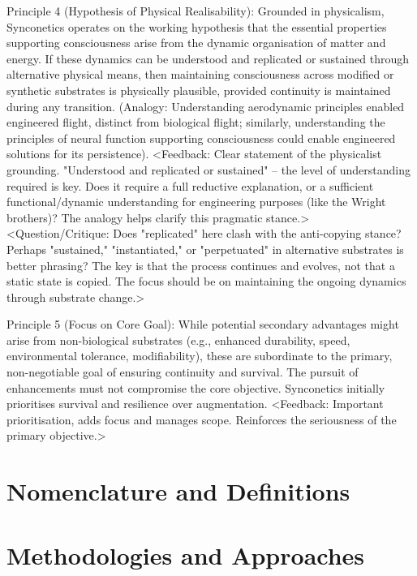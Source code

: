 \documentclass[10pt]{article}
\begin{document}
\begin{sloppypar}
  Principle 4 (Hypothesis of Physical Realisability): Grounded in physicalism, Synconetics operates on the working hypothesis that the essential properties supporting consciousness arise from the dynamic organisation of matter and energy. If these dynamics can be understood and replicated or sustained through alternative physical means, then maintaining consciousness across modified or synthetic substrates is physically plausible, provided continuity is maintained during any transition. (Analogy: Understanding aerodynamic principles enabled engineered flight, distinct from biological flight; similarly, understanding the principles of neural function supporting consciousness could enable engineered solutions for its persistence). <Feedback: Clear statement of the physicalist grounding. "Understood and replicated or sustained" – the level of understanding required is key. Does it require a full reductive explanation, or a sufficient functional/dynamic understanding for engineering purposes (like the Wright brothers)? The analogy helps clarify this pragmatic stance.> <Question/Critique: Does "replicated" here clash with the anti-copying stance? Perhaps "sustained," "instantiated," or "perpetuated" in alternative substrates is better phrasing? The key is that the process continues and evolves, not that a static state is copied. The focus should be on maintaining the ongoing dynamics through substrate change.>

  Principle 5 (Focus on Core Goal): While potential secondary advantages might arise from non-biological substrates (e.g., enhanced durability, speed, environmental tolerance, modifiability), these are subordinate to the primary, non-negotiable goal of ensuring continuity and survival. The pursuit of enhancements must not compromise the core objective. Synconetics initially prioritises survival and resilience over augmentation. <Feedback: Important prioritisation, adds focus and manages scope. Reinforces the seriousness of the primary objective.>


  \section{Nomenclature and Definitions}
  \label{sec:nomenclature}



  \section{Methodologies and Approaches}
  \label{sec:methodologies}


\end{sloppypar}
\end{document}
